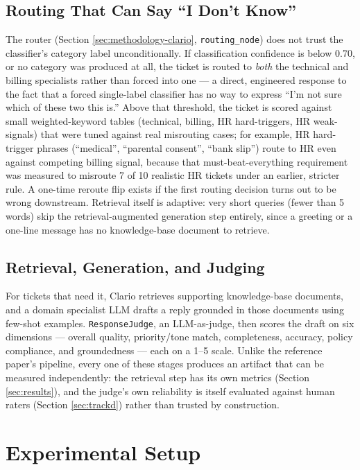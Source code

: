 \documentclass[conference]{IEEEtran}
\begin{document}
\subsection{Routing That Can Say ``I Don't Know''}
The router (Section \ref{sec:methodology-clario}, \texttt{routing\_node}) does not trust the classifier's category label unconditionally. If classification confidence is below 0.70, or no category was produced at all, the ticket is routed to \emph{both} the technical and billing specialists rather than forced into one --- a direct, engineered response to the fact that a forced single-label classifier has no way to express ``I'm not sure which of these two this is.'' Above that threshold, the ticket is scored against small weighted-keyword tables (technical, billing, HR hard-triggers, HR weak-signals) that were tuned against real misrouting cases; for example, HR hard-trigger phrases (``medical'', ``parental consent'', ``bank slip'') route to HR even against competing billing signal, because that must-beat-everything requirement was measured to misroute 7 of 10 realistic HR tickets under an earlier, stricter rule. A one-time reroute flip exists if the first routing decision turns out to be wrong downstream. Retrieval itself is adaptive: very short queries (fewer than 5 words) skip the retrieval-augmented generation step entirely, since a greeting or a one-line message has no knowledge-base document to retrieve.

\subsection{Retrieval, Generation, and Judging}
For tickets that need it, Clario retrieves supporting knowledge-base documents, and a domain specialist LLM drafts a reply grounded in those documents using few-shot examples. \texttt{ResponseJudge}, an LLM-as-judge, then scores the draft on six dimensions --- overall quality, priority/tone match, completeness, accuracy, policy compliance, and groundedness --- each on a 1--5 scale. Unlike the reference paper's pipeline, every one of these stages produces an artifact that can be measured independently: the retrieval step has its own metrics (Section \ref{sec:results}), and the judge's own reliability is itself evaluated against human raters (Section \ref{sec:trackd}) rather than trusted by construction.

\section{Experimental Setup}
\label{sec:setup}
\end{document}
